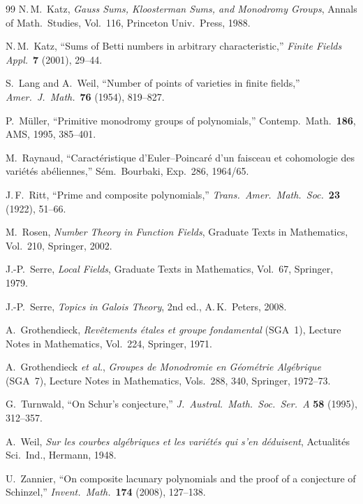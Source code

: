 \documentclass[11pt, a4paper]{article}
\theoremstyle{definition}
\theoremstyle{remark}
\begin{document}
\begin{thebibliography}{99}
  N.\,M.~Katz,
  \textit{Gauss Sums, Kloosterman Sums, and Monodromy Groups},
  Annals of Math.\ Studies, Vol.~116, Princeton Univ.\ Press, 1988.

  N.\,M.~Katz,
  ``Sums of Betti numbers in arbitrary characteristic,''
  \textit{Finite Fields Appl.}\ \textbf{7} (2001), 29--44.

  S.~Lang and A.~Weil,
  ``Number of points of varieties in finite fields,''
  \textit{Amer.\ J.\ Math.}\ \textbf{76} (1954), 819--827.

  P.~M\"uller,
  ``Primitive monodromy groups of polynomials,''
  Contemp.\ Math.\ \textbf{186}, AMS, 1995, 385--401.

  M.~Raynaud,
  ``Caract\'eristique d'Euler--Poincar\'e d'un faisceau et
  cohomologie des vari\'et\'es ab\'eliennes,''
  S\'em.\ Bourbaki, Exp.~286, 1964/65.

  J.\,F.~Ritt,
  ``Prime and composite polynomials,''
  \textit{Trans.\ Amer.\ Math.\ Soc.}\ \textbf{23} (1922), 51--66.

  M.~Rosen,
  \textit{Number Theory in Function Fields},
  Graduate Texts in Mathematics, Vol.~210, Springer, 2002.

  J.-P.~Serre,
  \textit{Local Fields},
  Graduate Texts in Mathematics, Vol.~67, Springer, 1979.

  J.-P.~Serre,
  \textit{Topics in Galois Theory}, 2nd ed.,
  A.\,K.\ Peters, 2008.

  A.~Grothendieck,
  \textit{Rev\^etements \'etales et groupe fondamental} (SGA~1),
  Lecture Notes in Mathematics, Vol.~224, Springer, 1971.

  A.~Grothendieck \textit{et al.},
  \textit{Groupes de Monodromie en G\'eom\'etrie Alg\'ebrique}
  (SGA~7), Lecture Notes in Mathematics, Vols.~288, 340,
  Springer, 1972--73.

  G.~Turnwald,
  ``On Schur's conjecture,''
  \textit{J.\ Austral.\ Math.\ Soc.\ Ser.~A}
  \textbf{58} (1995), 312--357.

  A.~Weil,
  \textit{Sur les courbes alg\'ebriques et les vari\'et\'es qui
  s'en d\'eduisent},
  Actualit\'es Sci.\ Ind., Hermann, 1948.

  U.~Zannier,
  ``On composite lacunary polynomials and the proof of a
  conjecture of Schinzel,''
  \textit{Invent.\ Math.}\ \textbf{174} (2008), 127--138.

\end{thebibliography}
\end{document}
